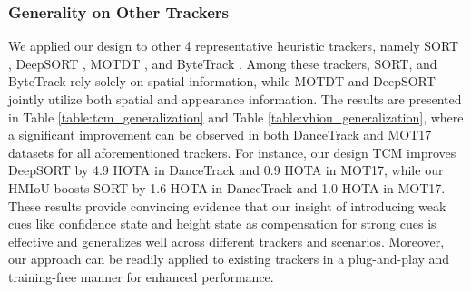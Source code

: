 \documentclass[letterpaper]{article} \usepackage{aaai23}  \usepackage{times}  \usepackage{helvet}  \usepackage{courier}  \usepackage[hyphens]{url}  \usepackage{graphicx} \urlstyle{rm} \def\UrlFont{\rm}  \usepackage{natbib}  \usepackage{caption} \frenchspacing  \setlength{\pdfpagewidth}{8.5in}  \setlength{\pdfpageheight}{11in}  \usepackage{algorithm}
\begin{document}
\begin{table}
\begin{center}
\caption{Ablation on the form of OCM in DanceTrack-val.}
\label{table:rocm}
\end{center}
\end{table}

\subsubsection{Generality on Other Trackers}
We applied our design to other 4 representative heuristic trackers, namely SORT \textcolor{blue}{\cite{bewley2016simple}}, DeepSORT \textcolor{blue}{\cite{wojke2017simple}}, MOTDT \textcolor{blue}{\cite{chen2018real}}, and ByteTrack \textcolor{blue}{\cite{zhang2022bytetrack}}. Among these trackers, SORT, and ByteTrack rely solely on spatial information, while MOTDT and DeepSORT jointly utilize both spatial and appearance information. The results are presented in Table \ref{table:tcm_generalization} and Table \ref{table:vhiou_generalization}, where a significant improvement can be observed in both DanceTrack and MOT17 datasets for all aforementioned trackers. For instance, our design TCM improves DeepSORT by 4.9 HOTA in DanceTrack and 0.9 HOTA in MOT17, while our HMIoU boosts SORT by 1.6 HOTA in DanceTrack and 1.0 HOTA in MOT17. These results provide convincing evidence that our insight of introducing weak cues like confidence state and height state as compensation for strong cues is effective and generalizes well across different trackers and scenarios. Moreover, our approach can be readily applied to existing trackers in a plug-and-play and training-free manner for enhanced performance.
\end{document}
